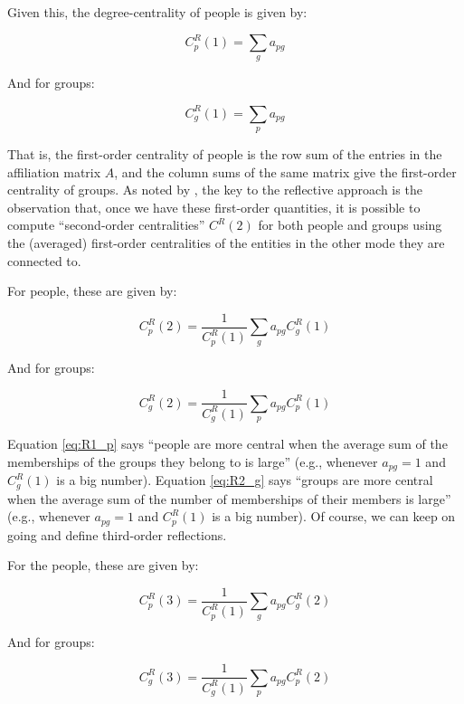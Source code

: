 \documentclass[a4paper,fleqn]{cas-sc}
\begin{document}
Given this, the degree-centrality of people is given by:

\begin{equation}
    C^R_p(1) = \sum_g a_{pg}
    \label{eq:R1_p}
\end{equation}

And for groups:

\begin{equation}
   C^R_g(1) = \sum_p a_{pg}
  \label{eq:R1_g}
\end{equation}

That is, the first-order centrality of people is the row sum of the entries in the affiliation matrix $A$, and the column sums of the same matrix give the first-order centrality of groups. As noted by \citet{hidalgo2009building}, the key to the reflective approach is the observation that, once we have these first-order quantities, it is possible to compute ``second-order centralities'' $C^R(2)$ for both people and groups using the (averaged) first-order centralities of the entities in the other mode they are connected to. 

For people, these are given by:

\begin{equation}
    C^R_p(2) = \frac{1}{C^R_p(1)}\sum_g a_{pg}C^R_g(1)
    \label{eq:R2_p}
\end{equation}

And for groups:

\begin{equation}
   C^R_g(2) = \frac{1}{C^R_g(1)}\sum_p a_{pg}C^R_p(1)
    \label{eq:R2_g}
\end{equation}

Equation \ref{eq:R1_p} says ``people are more central when the average sum of the memberships of the groups they belong to is large'' (e.g., whenever $a_{pg} = 1$ and $C^R_g(1)$ is a big number). Equation \ref{eq:R2_g} says ``groups are more central when the average sum of the number of memberships of their members is large'' (e.g., whenever $a_{pg} = 1$ and $C^R_p(1)$ is a big number). Of course, we can keep on going and define third-order reflections. 

For the people, these are given by:

\begin{equation}
   C^R_p(3) = \frac{1}{C^R_p(1)}\sum_g a_{pg}C^R_g(2)
   \label{eq:R3_p}
\end{equation}

And for groups:

\begin{equation}
   C^R_g(3) = \frac{1}{C^R_g(1)}\sum_p a_{pg}C^R_p(2)
   \label{eq:R3_g}
\end{equation}
\end{document}
